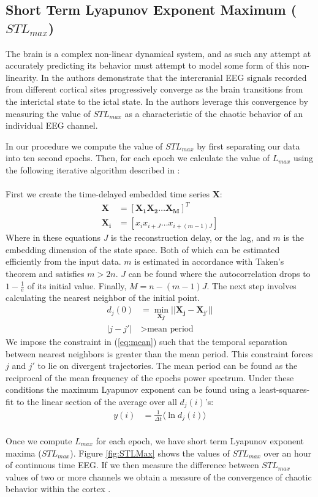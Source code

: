 \subsection{Short Term Lyapunov Exponent Maximum ($STL_{max}$)} \label{subsec:c}
The brain is a complex non-linear dynamical system, and as such any attempt at accurately predicting its behavior must attempt to model some form of this non-linearity.  In \cite{iasemidis01} the authors demonstrate that the intercranial EEG signals recorded from different cortical sites progressively converge as the brain transitions from the interictal state to the ictal state. In \cite{iasemidis05} the authors leverage this convergence by measuring the value of $STL_{max}$ as a characteristic of the chaotic behavior of an individual EEG channel.

In our procedure we compute the value of $STL_{max}$ by first separating our data into ten second epochs.  Then, for each epoch we calculate the value of $L_{max}$ using the following iterative algorithm described in \cite{rosenstein93}: \\ \\
First we create the time-delayed embedded time series $\boldsymbol{X}$:
\begin{align}
\boldsymbol{X} &= [\boldsymbol{X_1} \boldsymbol{X_2} \ldots \boldsymbol{X_M}]^T \\
\boldsymbol{X_i} &= [x_i x_{i+J} \ldots x_{i+(m-1)J}]
\end{align}
Where in these equations $J$ is the reconstruction delay, or the lag, and $m$ is the embedding dimension of the state space.  Both of which can be estimated efficiently from the input data.  $m$ is estimated in accordance with Taken's theorem and satisfies $m > 2n$.  $J$ can be found where the autocorrelation drops to $1-\frac{1}{e}$ of its initial value.  Finally, $M = n-(m-1)J$.  The next step involves calculating the nearest neighbor of the initial point.
\begin{align}
d_j(0) &= \min_{\boldsymbol{X_{j'}}}||\boldsymbol{X_j}-\boldsymbol{X_{j'}}|| \\
|j-j'| &> \text{mean period} \label{eq:mean}
\end{align}
We impose the constraint in (\ref{eq:mean}) such that the temporal separation between nearest neighbors is greater than the mean period.  This constraint forces $j$ and $j'$ to lie on divergent trajectories.  The mean period can be found as the reciprocal of the mean frequency of the epochs power spectrum.  Under these conditions the maximum Lyapunov exponent can be found using a least-squares-fit to the linear section of the average over all $d_j(i)$'s:
\begin{align}
y(i) &= \frac{1}{\Delta t}\langle \ln d_j(i) \rangle
\end{align}
\\
Once we compute $L_{max}$ for each epoch, we have short term Lyapunov exponent maxima ($STL_{max}$).  Figure \ref{fig:STLMax} shows the values of $STL_{max}$ over an hour of continuous time EEG.  If we then measure the difference between $STL_{max}$ values of two or more channels we obtain a measure of the convergence of chaotic behavior within the cortex \cite{mirowski08}.  

